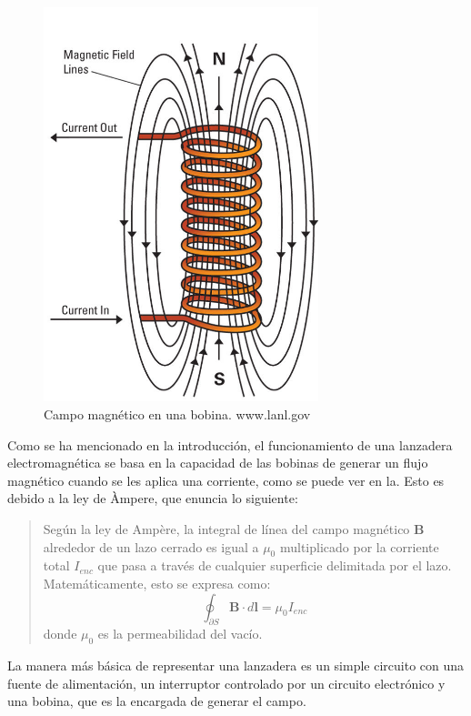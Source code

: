 \begin{figure}[H]
    \centering %
    \includegraphics[width=8cm]{FigurasMemoria/fig3electromagnet.jpg}
    \caption{Campo magnético en una bobina. www.lanl.gov}
    \label{fig:2} %
\end{figure}

Como se ha mencionado en la introducción, el funcionamiento de una lanzadera electromagnética se basa en la capacidad de las bobinas de generar un flujo magnético cuando se les aplica una corriente, como se puede ver en la. Esto es debido a la ley de Àmpere, que enuncia lo siguiente:

\begin{quote}
    Según la ley de Ampère, la integral de línea del campo magnético \(\mathbf{B}\) alrededor de un lazo cerrado es igual a \(\mu_0\) multiplicado por la corriente total \(I_{enc}\) que pasa a través de cualquier superficie delimitada por el lazo. Matemáticamente, esto se expresa como:
    \[
    \oint_{\partial S} \mathbf{B} \cdot d\mathbf{l} = \mu_0 I_{enc}
    \]
    donde \(\mu_0\) es la permeabilidad del vacío.
\end{quote}

La manera más básica de representar una lanzadera es un simple circuito con una fuente de alimentación, un interruptor controlado por un circuito electrónico y una bobina, que es la encargada de generar el campo.